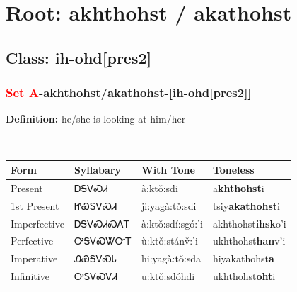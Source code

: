 \needspace{4in}
\section*{Root: akhthohst / akathohst}
\nopagebreak
{}
\needspace{3in}
\subsection*{Class: ih-ohd[pres2]}
\nopagebreak
\needspace{2in}
\subsubsection*{\textcolor{Red}{Set A}{-}\textbf{akhthohst/akathohst}{-}[ih-ohd[pres2]]}
\nopagebreak
\textbf{Definition: } he/she is looking at him/her
\\[0.5em]
\begin{tabularx}{\textwidth}{l X X X}%
\toprule%
\textbf{Form}&\textbf{Syllabary}&\textbf{With Tone}&\textbf{Toneless}\\%
\midrule%
Present&ᎠᎦᏙᏍᏗ&à:ktǒ:sdi&a\textbf{khthohst}i\\%
1st Present&ᏥᏯᎦᏙᏍᏗ&ji:yagà:tǒ:sdi&tsiy\textbf{akathohst}i\\%
Imperfective&ᎠᎦᏙᏍᏗᏍᎪᎢ&à:ktǒ:sdí:sgó:’i&akhthohst\textbf{ihsk}o'i\\%
Perfective&ᎤᎦᏙᏍᏔᏅᎢ&ù:ktǒ:stánv̌:’i&ukhthohst\textbf{han}v'i\\%
Imperative&ᎯᏯᎦᏙᏍᏓ&hi:yagà:tǒ:sda&hiyakathohst\textbf{a}\\%
Infinitive&ᎤᎦᏙᏍᏙᏗ&u:ktǒ:sdóhdi&ukhthohst\textbf{oht}i\\%
\bottomrule%
\end{tabularx}
\\[1em]